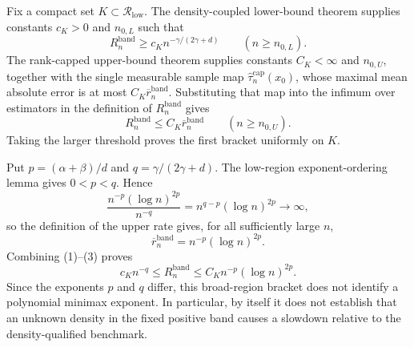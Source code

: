 Fix a compact set \(K\subset\mathcal R_{\mathrm{low}}\).  The
density-coupled lower-bound theorem supplies constants \(c_K>0\) and
\(n_{0,L}\) such that
\[
R_n^{\mathrm{band}}\geq c_Kn^{-\gamma/(2\gamma+d)}
\qquad(n\geq n_{0,L}).
\tag{1}
\]
The rank-capped upper-bound theorem supplies constants \(C_K<\infty\) and
\(n_{0,U}\), together with the single measurable sample map
\(\widehat\tau_n^{\mathrm{cap}}(x_0)\), whose maximal mean absolute error is
at most \(C_K\overline r_n^{\mathrm{band}}\).  Substituting that map into
the infimum over estimators in the definition of \(R_n^{\mathrm{band}}\)
gives
\[
R_n^{\mathrm{band}}\leq C_K\overline r_n^{\mathrm{band}}
\qquad(n\geq n_{0,U}).
\tag{2}
\]
Taking the larger threshold proves the first bracket uniformly on \(K\).

Put \(p=(\alpha+\beta)/d\) and
\(q=\gamma/(2\gamma+d)\).  The low-region exponent-ordering lemma gives
\(0<p<q\).  Hence
\[
\frac{n^{-p}(\log n)^{2p}}{n^{-q}}
=n^{q-p}(\log n)^{2p}\longrightarrow\infty,
\]
so the definition of the upper rate gives, for all sufficiently large \(n\),
\[
\overline r_n^{\mathrm{band}}=n^{-p}(\log n)^{2p}.
\tag{3}
\]
Combining (1)--(3) proves
\[
c_Kn^{-q}\leq R_n^{\mathrm{band}}
\leq C_Kn^{-p}(\log n)^{2p}.
\]
Since the exponents \(p\) and \(q\) differ, this broad-region bracket does
not identify a polynomial minimax exponent.  In particular, by itself it
does not establish that an unknown density in the fixed positive band causes
a slowdown relative to the density-qualified benchmark.